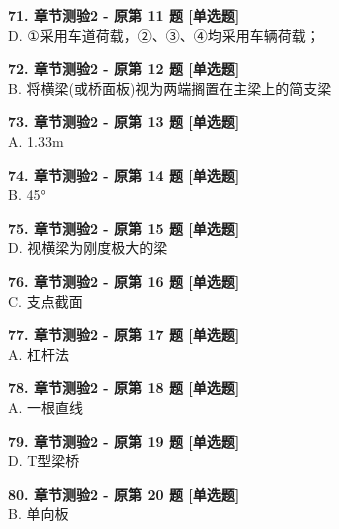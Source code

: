 \documentclass[UTF8,zihao=-4,openany]{ctexbook}
\begin{document}
\begin{answerline}
\textbf{71. 章节测验2 - 原第 11 题 [单选题]}\\
D. ①采用车道荷载，②、③、④均采用车辆荷载；
\end{answerline}

\begin{answerline}
\textbf{72. 章节测验2 - 原第 12 题 [单选题]}\\
B. 将横梁(或桥面板)视为两端搁置在主梁上的简支梁
\end{answerline}

\begin{answerline}
\textbf{73. 章节测验2 - 原第 13 题 [单选题]}\\
A. 1.33m
\end{answerline}

\begin{answerline}
\textbf{74. 章节测验2 - 原第 14 题 [单选题]}\\
B. 45°
\end{answerline}

\begin{answerline}
\textbf{75. 章节测验2 - 原第 15 题 [单选题]}\\
D. 视横梁为刚度极大的梁
\end{answerline}

\begin{answerline}
\textbf{76. 章节测验2 - 原第 16 题 [单选题]}\\
C. 支点截面
\end{answerline}

\begin{answerline}
\textbf{77. 章节测验2 - 原第 17 题 [单选题]}\\
A. 杠杆法
\end{answerline}

\begin{answerline}
\textbf{78. 章节测验2 - 原第 18 题 [单选题]}\\
A. 一根直线
\end{answerline}

\begin{answerline}
\textbf{79. 章节测验2 - 原第 19 题 [单选题]}\\
D. T型梁桥
\end{answerline}

\begin{answerline}
\textbf{80. 章节测验2 - 原第 20 题 [单选题]}\\
B. 单向板
\end{answerline}
\end{document}
